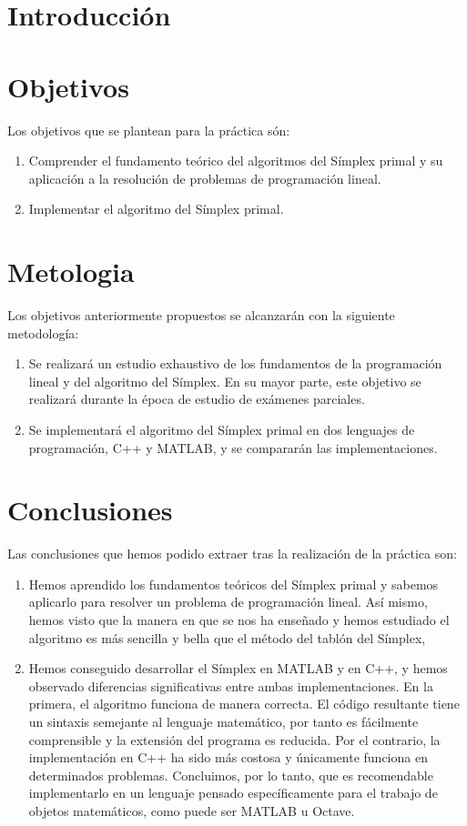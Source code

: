 \documentclass[12pt, titlepage]{article}
\begin{document}
\section{Introducción}
\section{Objetivos}
Los objetivos que se plantean para la práctica són:
\begin{enumerate}
\item	Comprender el fundamento teórico del algoritmos del Símplex primal y su aplicación a la resolución de problemas de programación lineal.
\item	Implementar el algoritmo del Símplex primal.
\end{enumerate}
\section{Metologia}
Los objetivos anteriormente propuestos se alcanzarán con la siguiente metodología:
\begin{enumerate}
\item	Se realizará un estudio exhaustivo de los fundamentos de la programación lineal y del algoritmo del Símplex. En su mayor parte, este objetivo se realizará durante la época de estudio de exámenes parciales.
\item	Se implementará el algoritmo del Símplex primal en dos lenguajes de programación, C++ y MATLAB, y se compararán las implementaciones.
\end{enumerate}
\section{Conclusiones}
Las conclusiones que hemos podido extraer tras la realización de la práctica son:
\begin{enumerate}
\item	Hemos aprendido los fundamentos teóricos del Símplex primal y sabemos aplicarlo para resolver un problema de programación lineal. Así mismo, hemos visto que la manera en que se nos ha enseñado y hemos estudiado el algoritmo es más sencilla y bella que el método del tablón del Símplex, 
\item	Hemos conseguido desarrollar el Símplex en MATLAB y en C++, y hemos observado diferencias significativas entre ambas implementaciones. En la primera, el algoritmo funciona de manera correcta. El código resultante tiene un sintaxis semejante al lenguaje matemático, por tanto es fácilmente comprensible y la extensión del programa es reducida. Por el contrario, la implementación en C++ ha sido más costosa y únicamente funciona en determinados problemas. Concluimos, por lo tanto, que es recomendable implementarlo en un lenguaje pensado específicamente para el trabajo de objetos matemáticos, como puede ser MATLAB u Octave.
\end{enumerate}
	
\end{document}
